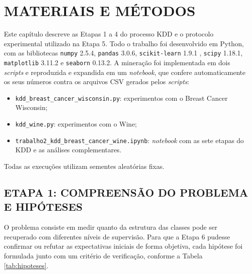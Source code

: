 \chapter[Materiais e Métodos]{MATERIAIS E MÉTODOS}

Este capítulo descreve as Etapas 1 a 4 do processo KDD e o protocolo experimental utilizado na Etapa 5. Todo o trabalho foi desenvolvido em Python, com as bibliotecas \texttt{numpy} 2.5.4, \texttt{pandas} 3.0.6, \texttt{scikit-learn} 1.9.1 \citep{pedregosa2011scikit}, \texttt{scipy} 1.18.1, \texttt{matplotlib} 3.11.2 e \texttt{seaborn} 0.13.2. A mineração foi implementada em dois \textit{scripts} e reproduzida e expandida em um \textit{notebook}, que confere automaticamente os seus números contra os arquivos CSV gerados pelos \textit{scripts}:

\begin{itemize}
    \item \texttt{kdd\_breast\_cancer\_wisconsin.py}: experimentos com o Breast Cancer Wisconsin;
    \item \texttt{kdd\_wine.py}: experimentos com o Wine;
    \item \texttt{trabalho2\_kdd\_breast\_cancer\_wine.ipynb}: \textit{notebook} com as sete etapas do KDD e as análises complementares.
\end{itemize}

\noindent Todas as execuções utilizam sementes aleatórias fixas.

\section{ETAPA 1: COMPREENSÃO DO PROBLEMA E HIPÓTESES}

O problema consiste em medir quanto da estrutura das classes pode ser recuperado com diferentes níveis de supervisão. Para que a Etapa 6 pudesse confirmar ou refutar as expectativas iniciais de forma objetiva, cada hipótese foi formulada junto com um critério de verificação, conforme a Tabela \ref{tab:hipoteses}.

